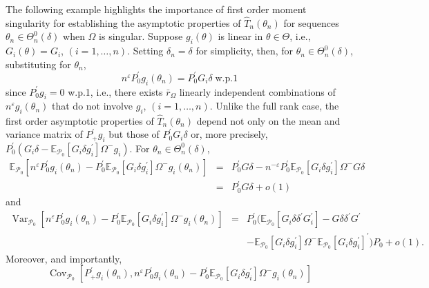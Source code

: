 \documentclass[hidelinks, 11 pt, a4paper, pdflatex]{article}
\DeclareMathOperator{\Var}{Var}
\DeclareMathOperator{\Cov}{Cov}
\begin{document}
{   The following example highlights the importance of first order moment singularity for establishing the asymptotic properties of $\hat{T}_{n}(\theta_{n})$ for sequences $\theta_n \in \Theta_n^{0}(\delta)$ when $\Omega$ is singular. Suppose $g_{i}(\theta)$ is linear in $\theta \in \Theta $, i.e., $G_{i}(\theta) = G_{i}$, $(i=1,\ldots,n)$. Setting $\delta_{n} = \delta$ for simplicity, then, for $\theta_{n} \in \Theta_{n}^{0}(\delta)$, substituting for $\theta_{n}$,
    \[
     n^{\varepsilon }P_{0}^{\prime}g_{i}(\theta _{n}) = P_{0}^{\prime}G_{i}\delta \; \text{w.p.}1
    \]
   since $P_{0}^{\prime}g_{i} = 0$ w.p.1, i.e., there exists $\bar{r}_{\Omega}$ linearly independent combinations of $n^{\varepsilon}g_{i}(\theta_{n})$ that do not involve $g_{i}$, $(i=1,\ldots,n)$. Unlike the full rank case, the first order asymptotic properties of $\hat{T}_{n}(\theta _{n})$ depend not only on the mean and variance matrix of $P_{+}^{\prime}g_{i}$ but those of $P_{0}^{\prime}G_{i}\delta$ or, more precisely, $P_{0}^{\prime}(G_{i}\delta - \mathbb{E}_{\mathcal{P}_0}[G_i \delta g_i^{\prime}] \Omega^{-} g_i)$. For $\theta _{n} \in \Theta_{n}^{0}(\delta )$,
    \begin{eqnarray*}
     \mathbb{E}_{\mathcal{P}_{0}}[n^{\varepsilon}P_{0}^{\prime}g_{i}(\theta_{n})
            - P_{0}^{\prime} \mathbb{E}_{\mathcal{P}_0}[G_i \delta g_i^{\prime}] \Omega^{-} g_i(\theta_{n})]
      & = & P_{0}^{\prime}G\delta
            - n^{-\varepsilon} P_{0}^{\prime}\mathbb{E}_{\mathcal{P}_0}[G_i \delta g_i^{\prime}]\Omega^{-}G\delta \\
      & = & P_{0}^{\prime} G \delta + o(1)
    \end{eqnarray*}
   and
    \begin{eqnarray*}
     \Var_{\mathcal{P}_0}[n^{\varepsilon}P_{0}^{\prime}g_{i}(\theta_{n}) - P_{0}^{\prime} \mathbb{E}_{\mathcal{P}_0}[G_i \delta
            g_i^{\prime}] \Omega^{-} g_i(\theta_{n})]
      & = & P_{0}^{\prime}(\mathbb{E}_{\mathcal{P}_{0}}[G_{i}\delta\delta^{\prime}G_{i}^{\prime}]
             - G\delta\delta^{\prime}G^{\prime} \\
      &   & - \mathbb{E}_{\mathcal{P}_0}[G_i \delta g_i^{\prime}] \Omega^{-}
             \mathbb{E}_{\mathcal{P}_0}[G_i \delta g_i^{\prime}]^{\prime})P_{0} + o(1).
    \end{eqnarray*}
   Moreover, and importantly,
    \[
     \Cov_{\mathcal{P}_0}[P_{+}^{\prime}g_{i}(\theta_{n}),n^{\varepsilon}P_{0}^{\prime}g_{i}(\theta_{n}) - P_{0}^{\prime}
            \mathbb{E}_{\mathcal{P}_0}[G_i \delta g_i^{\prime}] \Omega^{-} g_i(\theta_{n})]
\]}
\end{document}

